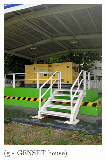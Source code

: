 \begin{figure}[!h]
\begin{minipage}[b]{0.22\linewidth}
		\includegraphics[width=\textwidth]{figures/fig_ch04_elecaudit_visualinspection_gensethouse}
		\caption*{(g - GENSET house)}
	\end{minipage}
	\hspace{0.03cm}
\begin{minipage}[b]{0.22\linewidth}

\end{minipage}
\end{figure}
